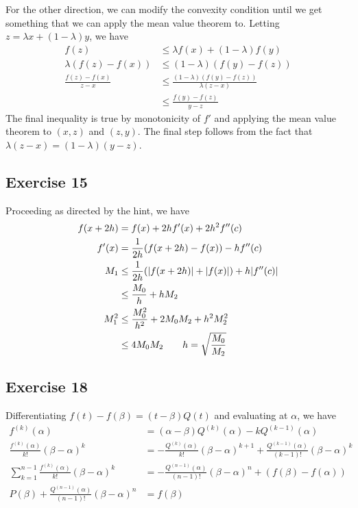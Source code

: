 For the other direction, we can modify the convexity condition until we get something that we can apply
the mean value theorem to. Letting $z = \lambda x + (1 - \lambda) y$, we have
\begin{align*}
        f(z) &\leq \lambda f(x) + (1 - \lambda) f(y) \\ 
        \lambda (f(z) - f(x)) &\leq (1 - \lambda) (f(y) - f(z)) \\
        \frac{f(z) - f(x)}{z - x} &\leq \frac{(1 - \lambda) (f(y) - f(z))}{\lambda (z - x)} \\
                                  &\leq \frac{f(y) - f(z)}{y - z}
\end{align*}
The final inequality is true by monotonicity of $f'$ and applying the mean value theorem 
to $(x, z)$ and $(z, y)$. The final step follows from the fact that $\lambda (z - x) = (1 - \lambda) (y - z)$.

\subsection{Exercise 15}
Proceeding as directed by the hint, we have
\begin{align*}
        f(x + 2h) &= f(x) + 2hf'(x) + 2h^2 f''(c) \\
        f'(x) &= \frac{1}{2h} (f(x + 2h) - f(x)) - hf''(c) \\
        M_1 &\leq \frac{1}{2h} (\abs{f(x + 2h)} + \abs{f(x)}) + h\abs{f''(c)} \\
            &\leq \frac{M_0}{h} + h M_2 \\
        M_1^2 &\leq \frac{M_0^2}{h^2} + 2 M_0 M_2 + h^2 M_2^2 \\
              &\leq 4 M_0 M_2 \quad \quad h = \sqrt{\frac{M_0}{M_2}}
\end{align*}

\subsection{Exercise 18}
Differentiating $f(t) - f(\beta) = (t - \beta) Q(t)$ and evaluating at $\alpha$, we have
\begin{align*}
        f^{(k)}(\alpha) &= (\alpha - \beta) Q^{(k)} (\alpha) - k Q^{(k - 1)} (\alpha) \\
        \frac{f^{(k)}(\alpha)}{k!} (\beta - \alpha)^k &= -\frac{Q^{(k)}(\alpha)}{k!}(\beta - \alpha)^{k+1} + 
        \frac{Q^{(k - 1)}(\alpha)}{(k - 1)!} (\beta - \alpha)^{k} \\
        \sum_{k = 1}^{n - 1}\frac{f^{(k)}(\alpha)}{k!} (\beta - \alpha)^k &=  -\frac{Q^{(n - 1)}(\alpha)}{(n - 1)!}(\beta - \alpha)^{n} + (f(\beta) - f(\alpha)) \\
        P(\beta) + \frac{Q^{(n - 1)}(\alpha)}{(n - 1)!}(\beta - \alpha)^{n} &= f(\beta)
\end{align*}

